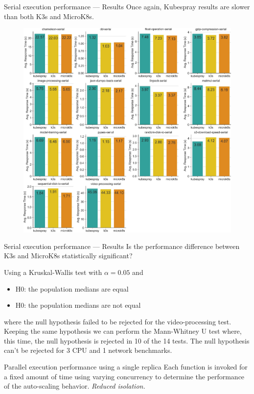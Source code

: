 \begin{frame}{Serial execution performance — Results}
Once again, Kubespray results are slower than both K3s and MicroK8s.

\begin{figure}
    \centering
    \includegraphics[width=0.6\linewidth]{static/11227_2022_4430_Fig5_HTML.jpg}
\end{figure}
\end{frame}

\begin{frame}{Serial execution performance — Results}
Is the performance difference between K3s and MicroK8s statistically significant?
\pause

Using a Kruskal-Wallis test with \(\alpha = 0.05\) and 
\begin{itemize}
    \item H0: the population medians are equal
    \item H0: the population medians are not equal
\end{itemize}

where the null hypothesis failed to be rejected for the video-processing test. Keeping the same hypothesis we can perform the Mann-Whitney U test where, this time, the null hypothesis is rejected in 10 of the 14 tests. The null hypothesis can't be rejected for 3 CPU and 1 network benchmarks.
\end{frame}

\begin{frame}{Parallel execution performance using a single replica}
Each function is invoked for a fixed amount of time using varying concurrency to determine the performance of the auto-scaling behavior. \textit{Reduced isolation.}
\end{frame}


